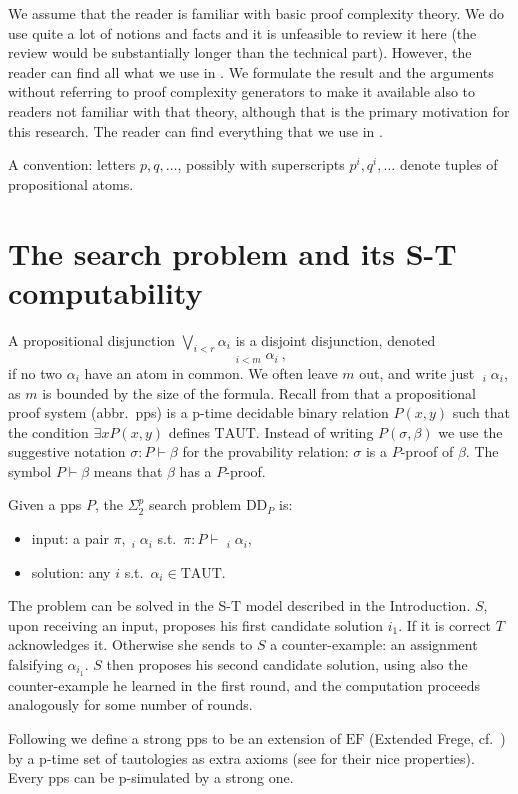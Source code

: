 \documentclass[11pt]{article}
\newcommand{\TAUT}{\mathrm{TAUT}}
\newcommand{\DDP}{\mathrm{DD}_P}
\newcommand{\EF}{\mathrm{EF}}
\newcommand{\dvee}{\mathop{\dot{\bigvee}}}
\begin{document}
We assume that the reader is familiar with basic proof complexity theory. We do use quite a lot of notions and facts and it is unfeasible to review it here (the review would be substantially longer than the technical part). However, the reader can find all what we use in \cite{Kra19}. We formulate the result and the arguments without referring to proof complexity generators to make it available also to readers not familiar with that theory, although that is the primary motivation for this research. The reader can find everything that we use in \cite{Kra25}.

A convention: letters $p,q,\ldots$, possibly with superscripts $p^i,q^i,\ldots$ denote tuples of propositional atoms.
\section{The search problem and its S-T computability}
A propositional disjunction $\bigvee_{i<r}\alpha_i$ is a disjoint disjunction, denoted
\[
\dvee_{i<m}\alpha_i\ ,
\]
if no two $\alpha_i$ have an atom in common. We often leave $m$ out, and write just $\dvee_i\alpha_i$, as $m$ is bounded by the size of the formula. Recall from \cite{CR79} that a propositional proof system (abbr.\ pps) is a p-time decidable binary relation $P(x,y)$ such that the condition $\exists xP(x,y)$ defines $\TAUT$. Instead of writing $P(\sigma,\beta)$ we use the suggestive notation $\sigma:P\vdash\beta$ for the provability relation: $\sigma$ is a $P$-proof of $\beta$. The symbol $P\vdash\beta$ means that $\beta$ has a $P$-proof.

Given a pps $P$, the $\Sigma^p_2$ search problem $\DDP$ is:
\begin{itemize}
\item input: a pair $\pi,\dvee_i\alpha_i$ s.t.\ $\pi:P\vdash\dvee_i\alpha_i$,
\item solution: any $i$ s.t.\ $\alpha_i\in\TAUT$.
\end{itemize}
The problem can be solved in the S-T model described in the Introduction. $S$, upon receiving an input, proposes his first candidate solution $i_1$. If it is correct $T$ acknowledges it. Otherwise she sends to $S$ a counter-example: an assignment falsifying $\alpha_{i_1}$. $S$ then proposes his second candidate solution, using also the counter-example he learned in the first round, and the computation proceeds analogously for some number of rounds.

Following \cite[Def.2.4.3]{Kra25} we define a strong pps to be an extension of $\EF$ (Extended Frege, cf.\ \cite{CR79}) by a p-time set of tautologies as extra axioms (see \cite[Thm.2.4.4]{Kra25} for their nice properties). Every pps can be p-simulated by a strong one.
\end{document}
